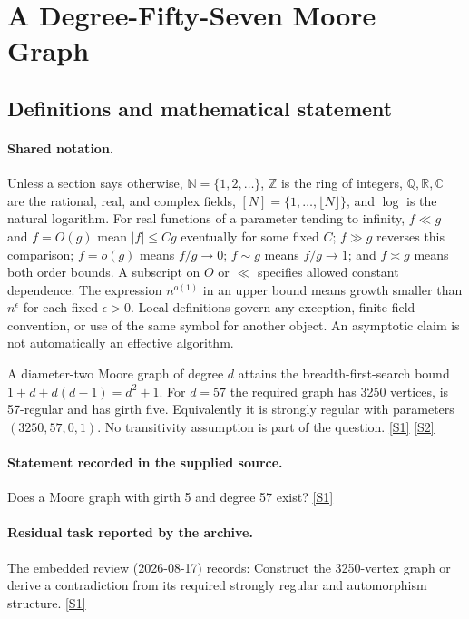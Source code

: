 \documentclass[11pt,a4paper]{article}
\newcommand{\N}{\mathbb{N}}
\newcommand{\Z}{\mathbb{Z}}
\newcommand{\Q}{\mathbb{Q}}
\newcommand{\R}{\mathbb{R}}
\newcommand{\C}{\mathbb{C}}
\newcommand{\sref}[2]{\hyperlink{source:#1:#2}{[S#2]}}
\begin{document}
\section{A Degree-Fifty-Seven Moore Graph}\label{statement}


\subsection{Definitions and mathematical statement}

\paragraph{Shared notation.}Unless a section says otherwise, $\N=\{1,2,\ldots\}$,
$\Z$ is the ring of integers, $\Q,\R,\C$ are the rational, real, and complex
fields, $[N]=\{1,\ldots,\lfloor N\rfloor\}$, and $\log$ is the natural
logarithm. For real functions of a parameter tending to infinity,
$f\ll g$ and $f=O(g)$ mean $|f|\leq Cg$ eventually for some fixed $C$;
$f\gg g$ reverses this comparison; $f=o(g)$ means $f/g\to0$;
$f\sim g$ means $f/g\to1$; and $f\asymp g$ means both order bounds.
A subscript on $O$ or $\ll$ specifies allowed constant dependence.
The expression $n^{o(1)}$ in an upper bound means growth smaller than
$n^\epsilon$ for each fixed $\epsilon>0$. Local definitions govern any
exception, finite-field convention, or use of the same symbol for another
object. An asymptotic claim is not automatically an effective algorithm.



A diameter-two Moore graph of degree $d$ attains the breadth-first-search bound $1+d+d(d-1)=d^2+1$. For $d=57$ the required graph has 3250 vertices, is 57-regular and has girth five. Equivalently it is strongly regular with parameters $(3250,57,0,1)$. No transitivity assumption is part of the question. \sref{statement}{1} \sref{statement}{2}

\paragraph{Statement recorded in the supplied source.}
Does a Moore graph with girth 5 and degree 57 exist? \sref{statement}{1}

\paragraph{Residual task reported by the archive.}

The embedded review (2026-08-17) records: Construct the 3250-vertex graph or derive a contradiction from its required strongly regular and automorphism structure. \sref{statement}{1}
\end{document}
